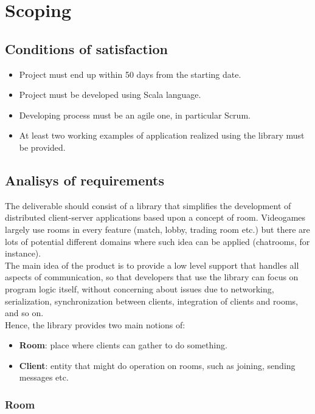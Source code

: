 \chapter{Scoping}

\section{Conditions of satisfaction}

\begin{itemize}
\item Project must end up within 50 days from the starting date. 
\item Project must be developed using Scala language.
\item Developing process must be an agile one, in particular Scrum.
\item At least two working examples of application realized using the library must be provided.
\end{itemize}

\section{Analisys of requirements}

The deliverable should consist of a library that simplifies the development of distributed client-server applications based upon a concept of room. Videogames largely use rooms in every feature (match, lobby, trading room etc.) but there are lots of potential different domains where such idea can be applied (chatrooms, for instance).
\\
The main idea of the product is to provide a low level support that handles all aspects of communication, so that developers that use the library can focus on program logic itself, without concerning about issues due to networking, serialization, synchronization between clients, integration of clients and rooms, and so on.
\\
Hence, the library provides two main notions of:
\begin{itemize}
\item \textbf{Room}: place where clients can gather to do something.
\item \textbf{Client}: entity that might do operation on rooms, such as joining, sending messages etc.
\end{itemize} 

\subsection{Room}

